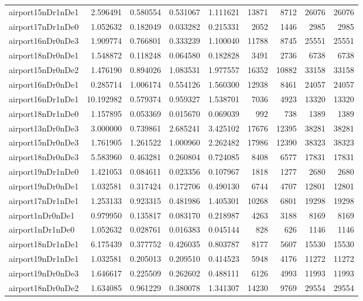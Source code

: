 \begin{longtable}{|l|r|r|r|r|r|r|r|r|}
airport15nDr1nDe1 & 2.596491 & 0.580554 & 0.531067 & 1.111621 & 13871 & 8712 & 26076 & 26076 \\
airport17nDr1nDe0 & 1.052632 & 0.182049 & 0.033282 & 0.215331 & 2052 & 1446 & 2985 & 2985 \\
airport16nDr0nDe3 & 1.909774 & 0.766801 & 0.333239 & 1.100040 & 11788 & 8745 & 25551 & 25551 \\
airport18nDr0nDe1 & 1.548872 & 0.118248 & 0.064580 & 0.182828 & 3491 & 2736 & 6738 & 6738 \\
airport15nDr0nDe2 & 1.476190 & 0.894026 & 1.083531 & 1.977557 & 16352 & 10882 & 33158 & 33158 \\
airport16nDr0nDe1 & 0.285714 & 1.006174 & 0.554126 & 1.560300 & 12938 & 8461 & 24057 & 24057 \\
airport16nDr1nDe1 & 10.192982 & 0.579374 & 0.959327 & 1.538701 & 7036 & 4923 & 13320 & 13320 \\
airport18nDr1nDe0 & 1.157895 & 0.053369 & 0.015670 & 0.069039 & 992 & 738 & 1389 & 1389 \\
airport13nDr0nDe3 & 3.000000 & 0.739861 & 2.685241 & 3.425102 & 17676 & 12395 & 38281 & 38281 \\
airport15nDr0nDe3 & 1.761905 & 1.261522 & 1.000960 & 2.262482 & 17986 & 12390 & 38323 & 38323 \\
airport18nDr0nDe3 & 5.583960 & 0.463281 & 0.260804 & 0.724085 & 8408 & 6577 & 17831 & 17831 \\
airport19nDr1nDe0 & 1.421053 & 0.084611 & 0.023356 & 0.107967 & 1818 & 1277 & 2680 & 2680 \\
airport19nDr0nDe1 & 1.032581 & 0.317424 & 0.172706 & 0.490130 & 6744 & 4707 & 12801 & 12801 \\
airport17nDr1nDe1 & 1.253133 & 0.923315 & 0.481986 & 1.405301 & 10268 & 6801 & 19298 & 19298 \\
airport1nDr0nDe1 & 0.979950 & 0.135817 & 0.083170 & 0.218987 & 4263 & 3188 & 8169 & 8169 \\
airport1nDr1nDe0 & 1.052632 & 0.028761 & 0.016383 & 0.045144 & 828 & 626 & 1146 & 1146 \\
airport18nDr1nDe1 & 6.175439 & 0.377752 & 0.426035 & 0.803787 & 8177 & 5607 & 15530 & 15530 \\
airport19nDr1nDe1 & 1.032581 & 0.205013 & 0.209510 & 0.414523 & 5948 & 4176 & 11272 & 11272 \\
airport19nDr0nDe3 & 1.646617 & 0.225509 & 0.262602 & 0.488111 & 6126 & 4993 & 11993 & 11993 \\
airport18nDr0nDe2 & 1.634085 & 0.961229 & 0.380078 & 1.341307 & 14230 & 9769 & 29554 & 29554 \\

\end{longtable}
